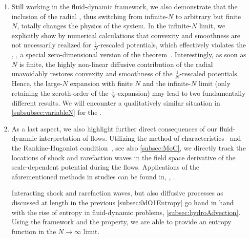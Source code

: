 \begin{enumerate}
		\item	Still working in the \frg{} fluid-dynamic framework, we also demonstrate that the inclusion of the radial \sigmaMode{}, thus switching from infinite-$N$ to arbitrary but finite $N$, totally changes the physics of the system. 
		In the infinite-$N$ limit, we explicitly show by numerical calculations that convexity and smoothness are not necessarily realized for $\tfrac{1}{N}$-rescaled \ir{} potentials, which effectively violates the \cmwhTheoremWithRefs, \ie{}, a special zero-dimensional version of the theorem~\cite{Moroz:2011thesis,Koenigstein:2021syz}.
		Interestingly, as soon as $N$ is finite, the highly non-linear diffusive contribution of the radial \sigmaMode{} unavoidably restores convexity and smoothness of the $\tfrac{1}{N}$-rescaled \ir{} potentials.
		Hence, the large-$N$ expansion with finite $N$ and the infinite-$N$ limit (only retaining the zeroth-order of the $\tfrac{1}{N}$-expansion) may lead to two fundamentally different results.
		We will encounter a qualitatively similar situation in \cref{subsubsec:variableN} for the \gnym{}.
		
		\item	As a last aspect, we also highlight further direct consequences of our fluid-dynamic interpretation of \frg{}  flows. 
		Utilizing the method of characteristics~\cite{polyanin2016handbook,LeVeque:2002,Delgado2006Aug} and the Rankine-Hugoniot condition~\cite{Rankine:1870,Hugoniot:1887}, see also \cref{subsec:MoC}, we directly track the locations of shock and rarefaction waves in the field space derivative of the scale-dependent potential during the \rg{}  flows.
		Applications of the aforementioned methods in \grg{}  studies can be found in, \eg{}, .
		
		Interacting shock and rarefaction waves, but also diffusive processes \dash{} as discussed at length in the previous \cref{subsec:0dO1Entropy} \dash{} go hand in hand with the rise of entropy in fluid-dynamic problems, \cf{} \cref{subsec:hydroAdvection}.
		Using the \cfd{} framework and the \tvni{} property, we are able to provide an entropy function in the $N\rightarrow\infty$ limit.
	\end{enumerate}

